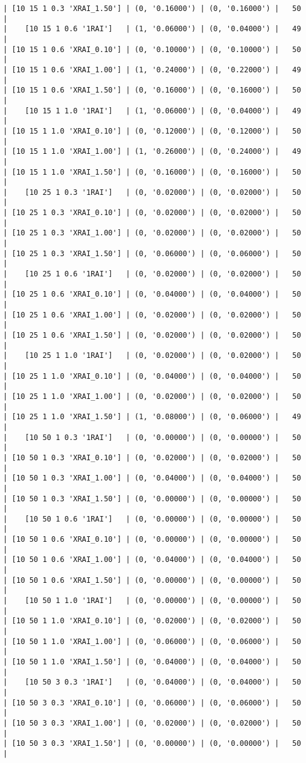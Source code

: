 \documentclass{article}
\begin{document}
\begin{verbatim}
| [10 15 1 0.3 'XRAI_1.50'] | (0, '0.16000') | (0, '0.16000') |   50  |
|    [10 15 1 0.6 '1RAI']   | (1, '0.06000') | (0, '0.04000') |   49  |
| [10 15 1 0.6 'XRAI_0.10'] | (0, '0.10000') | (0, '0.10000') |   50  |
| [10 15 1 0.6 'XRAI_1.00'] | (1, '0.24000') | (0, '0.22000') |   49  |
| [10 15 1 0.6 'XRAI_1.50'] | (0, '0.16000') | (0, '0.16000') |   50  |
|    [10 15 1 1.0 '1RAI']   | (1, '0.06000') | (0, '0.04000') |   49  |
| [10 15 1 1.0 'XRAI_0.10'] | (0, '0.12000') | (0, '0.12000') |   50  |
| [10 15 1 1.0 'XRAI_1.00'] | (1, '0.26000') | (0, '0.24000') |   49  |
| [10 15 1 1.0 'XRAI_1.50'] | (0, '0.16000') | (0, '0.16000') |   50  |
|    [10 25 1 0.3 '1RAI']   | (0, '0.02000') | (0, '0.02000') |   50  |
| [10 25 1 0.3 'XRAI_0.10'] | (0, '0.02000') | (0, '0.02000') |   50  |
| [10 25 1 0.3 'XRAI_1.00'] | (0, '0.02000') | (0, '0.02000') |   50  |
| [10 25 1 0.3 'XRAI_1.50'] | (0, '0.06000') | (0, '0.06000') |   50  |
|    [10 25 1 0.6 '1RAI']   | (0, '0.02000') | (0, '0.02000') |   50  |
| [10 25 1 0.6 'XRAI_0.10'] | (0, '0.04000') | (0, '0.04000') |   50  |
| [10 25 1 0.6 'XRAI_1.00'] | (0, '0.02000') | (0, '0.02000') |   50  |
| [10 25 1 0.6 'XRAI_1.50'] | (0, '0.02000') | (0, '0.02000') |   50  |
|    [10 25 1 1.0 '1RAI']   | (0, '0.02000') | (0, '0.02000') |   50  |
| [10 25 1 1.0 'XRAI_0.10'] | (0, '0.04000') | (0, '0.04000') |   50  |
| [10 25 1 1.0 'XRAI_1.00'] | (0, '0.02000') | (0, '0.02000') |   50  |
| [10 25 1 1.0 'XRAI_1.50'] | (1, '0.08000') | (0, '0.06000') |   49  |
|    [10 50 1 0.3 '1RAI']   | (0, '0.00000') | (0, '0.00000') |   50  |
| [10 50 1 0.3 'XRAI_0.10'] | (0, '0.02000') | (0, '0.02000') |   50  |
| [10 50 1 0.3 'XRAI_1.00'] | (0, '0.04000') | (0, '0.04000') |   50  |
| [10 50 1 0.3 'XRAI_1.50'] | (0, '0.00000') | (0, '0.00000') |   50  |
|    [10 50 1 0.6 '1RAI']   | (0, '0.00000') | (0, '0.00000') |   50  |
| [10 50 1 0.6 'XRAI_0.10'] | (0, '0.00000') | (0, '0.00000') |   50  |
| [10 50 1 0.6 'XRAI_1.00'] | (0, '0.04000') | (0, '0.04000') |   50  |
| [10 50 1 0.6 'XRAI_1.50'] | (0, '0.00000') | (0, '0.00000') |   50  |
|    [10 50 1 1.0 '1RAI']   | (0, '0.00000') | (0, '0.00000') |   50  |
| [10 50 1 1.0 'XRAI_0.10'] | (0, '0.02000') | (0, '0.02000') |   50  |
| [10 50 1 1.0 'XRAI_1.00'] | (0, '0.06000') | (0, '0.06000') |   50  |
| [10 50 1 1.0 'XRAI_1.50'] | (0, '0.04000') | (0, '0.04000') |   50  |
|    [10 50 3 0.3 '1RAI']   | (0, '0.04000') | (0, '0.04000') |   50  |
| [10 50 3 0.3 'XRAI_0.10'] | (0, '0.06000') | (0, '0.06000') |   50  |
| [10 50 3 0.3 'XRAI_1.00'] | (0, '0.02000') | (0, '0.02000') |   50  |
| [10 50 3 0.3 'XRAI_1.50'] | (0, '0.00000') | (0, '0.00000') |   50  |

\end{verbatim}
\end{document}
